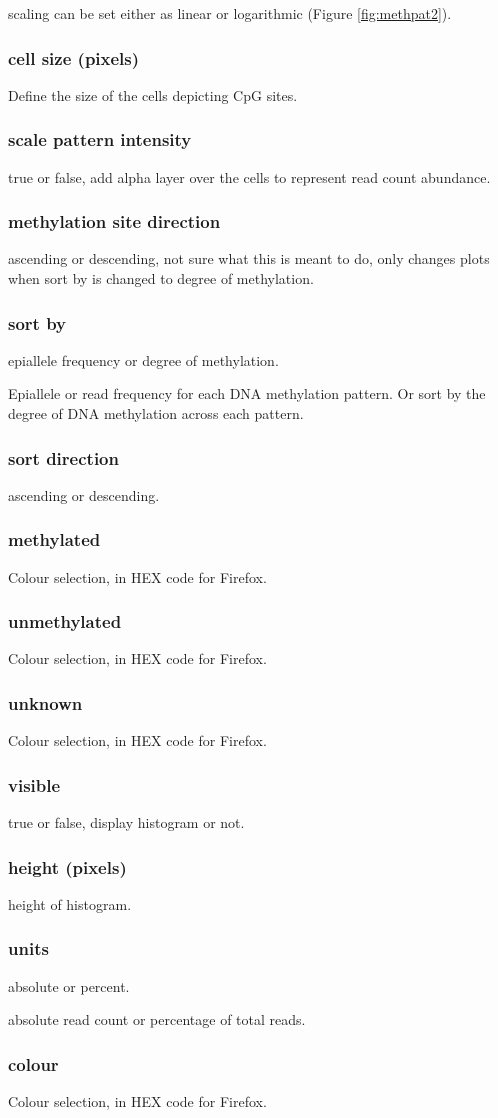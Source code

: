 \documentclass[11pt,a4paper]{article}
\begin{document}
scaling can be set either as linear or logarithmic (Figure \ref{fig:methpat2}).

\subsubsection{cell size (pixels)}
Define the size of the cells depicting CpG sites. 

\subsubsection{scale pattern intensity}
true or false, add alpha layer over the cells to represent read count abundance.

\subsubsection{methylation site direction}
ascending or descending, not sure what this is meant to do, only changes plots when sort by is changed to degree of methylation.

\subsubsection{sort by}
epiallele frequency or degree of methylation. 

Epiallele or read frequency for each DNA methylation pattern. Or sort by the degree of DNA methylation across each pattern.

\subsubsection{sort direction}
ascending or descending.

\subsubsection{methylated}
Colour selection, in HEX code for Firefox.

\subsubsection{unmethylated}
Colour selection, in HEX code for Firefox.

\subsubsection{unknown}
Colour selection, in HEX code for Firefox.

\subsubsection{visible}
true or false, display histogram or not.

\subsubsection{height (pixels)}
height of histogram.

\subsubsection{units}
absolute or percent.

absolute read count or percentage of total reads.

\subsubsection{colour}
Colour selection, in HEX code for Firefox.
\end{document}
